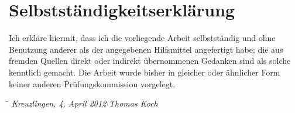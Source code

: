 \documentclass[12pt,a4paper,twoside]{scrartcl}		%
\begin{document}
\newpage
{}


\section*{Selbstständigkeitserklärung}
\thispagestyle{empty}
Ich erkläre hiermit, dass ich die vorliegende Arbeit selbstständig und ohne
Benutzung anderer als der angegebenen Hilfsmittel angefertigt habe; die aus
fremden Quellen direkt oder indirekt übernommenen Gedanken sind als solche
kenntlich gemacht.  Die Arbeit wurde bisher in gleicher oder ähnlicher Form
keiner anderen Prüfungskommission vorgelegt.
\vspace{3cm}
\begin{tabbing}
\hspace{6cm}  \= \kill
\textit{Kreuzlingen, 4. April 2012} \> \textit{Thomas Koch}
\end{tabbing}
\end{document}
